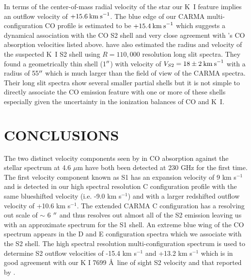 \documentclass[iop]{emulateapj}
\begin{document}
In terms of the center-of-mass radial velocity of the star our K~I feature implies an outflow velocity of $+15.6\>{\rm km\>s}^{-1}$. The blue edge of our CARMA multi-configuration CO profile is estimated to be $+15.4\>{\rm km\>s}^{-1}$  which suggests a dynamical association with the CO S2 shell and very close agreement with \citeauthor{1979ApJ...233L.135B}'s \citeyearpar{1979ApJ...233L.135B} CO absorption velocities listed above. \cite{2002A&A...386.1009P} have also estimated the radius and velocity of the suspected K~I S2 shell using $R=110,000$ resolution long slit spectra. They found a geometrically thin shell (1$\mbox{$^{\prime\prime}$}$) with velocity of $V_{S2}=18\pm 2\>{\rm km\>s}^{-1}$ with a radius of 55$\mbox{$^{\prime\prime}$}$ which is much larger than the field of view of the CARMA spectra. Their long slit spectra show several smaller partial shells but it is not simple to directly associate the CO emission feature with one or more of these shells especially given the uncertainty in the ionization balances of CO and K~I.

\section{CONCLUSIONS}
The two distinct velocity components seen by \cite{1979ApJ...233L.135B} in CO absorption against the stellar spectrum at 4.6 $\mu$m have both been detected at 230 GHz for the first time. The first velocity component known as S1 has an expansion velocity of 9 km s${}^{-1}$ \citep{1979ApJ...233L.135B} and is detected in our high spectral resolution C configuration profile with the same blueshifted velocity (i.e. -9.0 km s${}^{-1}$) and with a larger redshifted outflow velocity of +10.6 km s${}^{-1}$. The extended CARMA C configuration has a resolving out scale of $\sim$ 6 $\mbox{$^{\prime\prime}$}$ and thus resolves out almost all of the S2 emission leaving us with an approximate spectrum for the S1 shell. An extreme blue wing of the CO spectrum appears in the D and E configuration spectra which we associate with the S2 shell. The high spectral resolution multi-configuration spectrum is used to determine S2 outflow velocities of -15.4 km s${}^{-1}$ and +13.2 km s${}^{-1}$ which is in good agreement with our K I 7699 \AA \ line of sight S2 velocity and that reported by \cite{1979ApJ...233L.135B}. 
\end{document}
